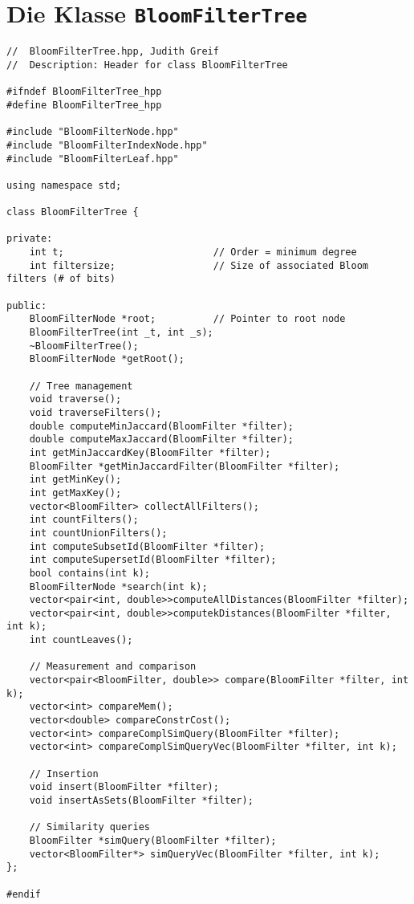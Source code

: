 \section{Die Klasse \texttt{BloomFilterTree}}\label{sec:BloomFilterTree.hpp}
\small{
\begin{verbatim}
//  BloomFilterTree.hpp, Judith Greif
//  Description: Header for class BloomFilterTree

#ifndef BloomFilterTree_hpp
#define BloomFilterTree_hpp

#include "BloomFilterNode.hpp"
#include "BloomFilterIndexNode.hpp"
#include "BloomFilterLeaf.hpp"

using namespace std;

class BloomFilterTree {
    
private:
    int t;                          // Order = minimum degree
    int filtersize;                 // Size of associated Bloom filters (# of bits)
    
public:
    BloomFilterNode *root;          // Pointer to root node   
    BloomFilterTree(int _t, int _s);
    ~BloomFilterTree();   
    BloomFilterNode *getRoot();
    
    // Tree management
    void traverse();
    void traverseFilters();
    double computeMinJaccard(BloomFilter *filter);
    double computeMaxJaccard(BloomFilter *filter);
    int getMinJaccardKey(BloomFilter *filter);
    BloomFilter *getMinJaccardFilter(BloomFilter *filter);
    int getMinKey();
    int getMaxKey();
    vector<BloomFilter> collectAllFilters();
    int countFilters();
    int countUnionFilters(); 
    int computeSubsetId(BloomFilter *filter);
    int computeSupersetId(BloomFilter *filter);
    bool contains(int k);
    BloomFilterNode *search(int k);
    vector<pair<int, double>>computeAllDistances(BloomFilter *filter);
    vector<pair<int, double>>computekDistances(BloomFilter *filter, int k);
    int countLeaves(); 
    
    // Measurement and comparison
    vector<pair<BloomFilter, double>> compare(BloomFilter *filter, int k);
    vector<int> compareMem();
    vector<double> compareConstrCost();
    vector<int> compareComplSimQuery(BloomFilter *filter);
    vector<int> compareComplSimQueryVec(BloomFilter *filter, int k);
    
    // Insertion
    void insert(BloomFilter *filter);
    void insertAsSets(BloomFilter *filter);
    
    // Similarity queries
    BloomFilter *simQuery(BloomFilter *filter);
    vector<BloomFilter*> simQueryVec(BloomFilter *filter, int k);
};

#endif
\end{verbatim}
}
\newpage
